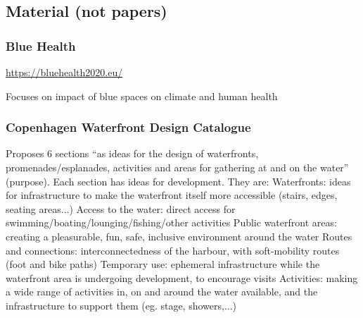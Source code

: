 \documentclass{article}
\begin{document}

\subsection{Material (not papers)}

\subsubsection{Blue Health}

\url{https://bluehealth2020.eu/}

\begin{outline}
	\1 Focuses on impact of blue spaces on climate and human health
\end{outline}

\subsubsection{Copenhagen Waterfront Design Catalogue}

\parencite{copenhagenwaterfront}

\begin{outline}
	\1 Proposes 6 sections ``as ideas for the design of waterfronts, promenades/esplanades, activities and areas for gathering at and on the water'' (purpose). Each section has ideas for development. They are:
		\2 Waterfronts: ideas for infrastructure to make the waterfront itself more accessible (stairs, edges, seating areas...)
		\2 Access to the water: direct access for swimming/boating/lounging/fishing/other activities
		\2 Public waterfront areas: creating a pleasurable, fun, safe, inclusive environment around the water
		\2 Routes and connections: interconnectedness of the harbour, with soft-mobility routes (foot and bike paths)
		\2 Temporary use: ephemeral infrastructure while the waterfront area is undergoing development, to encourage visits
		\2 Activities: making a wide range of activities in, on and around the water available, and the infrastructure to support them (eg. stage, showers,...)
\end{outline}


\printbibliography
\end{document}
